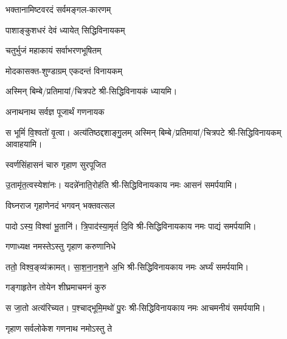 \begin{center}

{भक्तानामिष्टवरदं सर्वमङ्गल-कारणम्}

{पाशाङ्कुशधरं देवं ध्यायेत् सिद्धिविनायकम्}

{चतुर्भुजं महाकायं सर्वाभरणभूषितम्}

{मोदकासक्त-शुण्डाग्रम् एकदन्तं विनायकम्}

अस्मिन् बिम्बे/प्रतिमायां/चित्रपटे श्री-सिद्धिविनायकं ध्यायमि।

{अनाथनाथ सर्वज्ञ पूजार्थं गणनायक}

{स भूमिं॑ वि॒श्वतो॑ वृ॒त्वा। अत्य॑तिष्ठद्दशाङ्गु॒लम्}
अस्मिन् बिम्बे/प्रतिमायां/चित्रपटे श्री-सिद्धिविनायकम् आवाहयामि।
\medskip

{स्वर्णसिंहासनं चारु गृहाण सुरपूजित}

{उ॒तामृ॑त॒त्वस्येशा॑नः। यदन्ने॑नाति॒रोह॑ति}
श्री-सिद्धिविनायकाय नमः आसनं समर्पयामि।\medskip

{विघ्नराज गृहाणेनदं भगवन् भक्तवत्सल}

{पादोऽस्य॒ विश्वा॑ भू॒तानि॑। त्रि॒पाद॑स्या॒मृतं॑ दि॒वि}
श्री-सिद्धिविनायकाय नमः पाद्यं समर्पयामि।\medskip

{गणाध्यक्ष नमस्तेऽस्तु गृहाण करुणानिधे}

{ततो॒ विश्व॒ङ्व्य॑क्रामत्। सा॒श॒ना॒न॒श॒ने अ॒भि}
श्री-सिद्धिविनायकाय नमः अर्घ्यं समर्पयामि।\medskip

{गङ्गाहृतेन तोयेन शीघ्रमाचमनं कुरु}

{स जा॒तो अत्य॑रिच्यत। प॒श्चाद्भूमि॒मथो॑ पु॒रः}
श्री-सिद्धिविनायकाय नमः आचमनीयं समर्पयामि।\medskip

{गृहाण सर्वलोकेश गणनाथ नमोऽस्तु ते}


\end{center}
